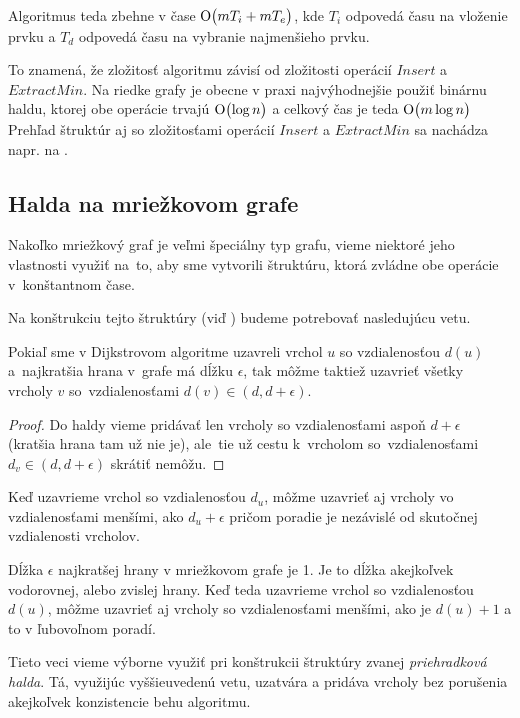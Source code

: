 Algoritmus teda zbehne v čase $\operatorname{O}\bigl(m T_i + m T_e\bigr)$, kde $T_i$ odpovedá času na vloženie prvku a $T_d$ odpovedá času na vybranie najmenšieho prvku.

To znamená, že zložitosť algoritmu závisí od zložitosti operácií $Insert$ a $ExtractMin$. Na riedke grafy je obecne v praxi najvýhodnejšie použiť 
binárnu haldu, ktorej obe operácie trvajú $\operatorname{O}\bigl(\log{n} \bigr) $ a celkový čas je teda $\operatorname{O}\bigl(m\log{n}\bigr)$
Prehľad štruktúr aj so zložitosťami operácií $Insert$ a $ExtractMin$ sa nachádza napr. na \cite{mares07}.

\subsection{Halda na mriežkovom grafe}
Nakoľko mriežkový graf je veľmi špeciálny typ grafu,
vieme niektoré jeho vlastnosti využiť na~to, aby sme vytvorili štruktúru, ktorá zvládne obe operácie v~konštantnom čase. 


Na konštrukciu tejto štruktúry (viď \cite{gs97}) budeme potrebovať nasledujúcu vetu.

\begin{theorem}
Pokiaľ sme v Dijkstrovom algoritme uzavreli vrchol $u$ so vzdialenosťou $d(u)$ a~najkratšia hrana v~grafe má dĺžku $\epsilon$, tak môžme taktiež 
uzavrieť všetky vrcholy $v$ so~vzdialenosťami $d(v) \in (d, d + \epsilon)$.
\end{theorem}
\begin{proof}
Do haldy vieme pridávať len vrcholy so vzdialenosťami aspoň $d + \epsilon$ (kratšia hrana tam už nie je), 
ale~tie už cestu k~vrcholom so~vzdialenosťami
$d_v \in (d, d + \epsilon)$ skrátiť nemôžu.
\end{proof}


\begin{consequence}
Keď uzavrieme vrchol so vzdialenosťou $d_u$, môžme uzavrieť aj vrcholy vo vzdialenosťami menšími, ako $d_u + \epsilon$
pričom poradie je nezávislé od skutočnej vzdialenosti vrcholov.
\end{consequence}

\begin{example}
\label{ex:range}
Dĺžka $\epsilon$ najkratšej hrany v mriežkovom grafe je 1. Je to dĺžka akejkoľvek vodorovnej, alebo zvislej hrany.
Keď teda uzavrieme vrchol so vzdialenosťou $d(u)$, môžme uzavrieť aj vrcholy so vzdialenosťami menšími, ako je $d(u) + 1$ a to v ľubovoľnom poradí.
\end{example}

Tieto veci vieme výborne využiť pri konštrukcii štruktúry
zvanej {\sl priehradková halda}. Tá, využijúc vyššieuvedenú vetu, uzatvára a pridáva vrcholy bez porušenia akejkoľvek konzistencie behu algoritmu.

